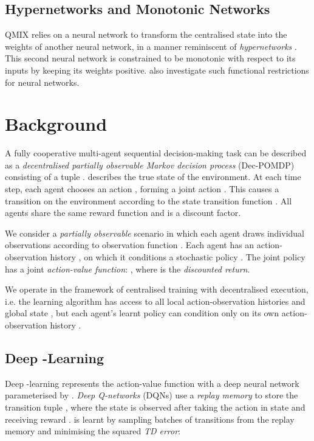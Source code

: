 \documentclass[twoside,11pt]{article}
\renewcommand{\cite}{\citep}
\begin{document}
\subsection{Hypernetworks and Monotonic Networks}
QMIX relies on a neural network to transform the centralised state into the weights of another neural network, in a manner reminiscent of 
\emph{hypernetworks} \citep{ha_hypernetworks_2016}. This second neural network 
is constrained to be monotonic with respect to its inputs by keeping its 
weights positive. \citet{Dugas_2009} also investigate such functional restrictions 
for neural networks.









 \section{Background}
\label{sec:background}


A fully cooperative multi-agent sequential decision-making task can be described as a \emph{decentralised partially observable Markov decision process} (Dec-POMDP) \cite{oliehoek_concise_2016} consisting of a tuple . 
 describes the true state of the environment.
At each time step, each agent  chooses an action , forming a joint action . 
This causes a transition on the environment according to the state transition function . 
All agents share the same reward function  and  is a discount factor. 

We consider a \textit{partially observable} scenario in which each agent draws individual observations  according to observation function . 
Each agent has an action-observation history , on which it conditions a stochastic policy . The joint policy  has a joint \textit{action-value function}: , where  is the \textit{discounted return}.


We operate in the framework of centralised training with decentralised 
execution, i.e. the
learning algorithm has access to all local action-observation histories 
 and global state , but each agent's learnt policy can 
condition only on its own action-observation history .

\subsection{Deep -Learning}

Deep -learning represents the action-value function with a deep neural network parameterised by . \textit{Deep Q-networks} (DQNs) \cite{mnih_human-level_2015} use a  \textit{replay memory} to store the transition tuple , where the state    is observed after taking the action  in state  and receiving reward .  is learnt by sampling batches of  transitions from the replay memory and minimising the squared \textit{TD error}:
 
\end{document}
